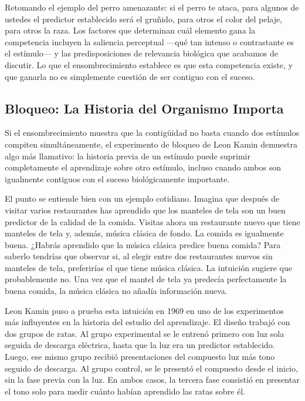 \documentclass[
  letterpaper,
  DIV=11,
  numbers=noendperiod]{scrreprt}
\begin{document}
\begin{tcolorbox}[enhanced jigsaw, toprule=.15mm, arc=.35mm, colback=white, opacityback=0, colframe=quarto-callout-note-color-frame, breakable, rightrule=.15mm, left=2mm, leftrule=.75mm, bottomrule=.15mm]
Retomando el ejemplo del perro amenazante: si el perro te ataca, para
algunos de ustedes el predictor establecido será el gruñido, para otros
el color del pelaje, para otros la raza. Los factores que determinan
cuál elemento gana la competencia incluyen la saliencia perceptual
---qué tan intenso o contrastante es el estímulo--- y las
predisposiciones de relevancia biológica que acabamos de discutir. Lo
que el ensombrecimiento establece es que esta competencia existe, y que
ganarla no es simplemente cuestión de ser contiguo con el suceso.

\subsection{Bloqueo: La Historia del Organismo
Importa}\label{bloqueo-la-historia-del-organismo-importa}

Si el ensombrecimiento muestra que la contigüidad no basta cuando dos
estímulos compiten simultáneamente, el experimento de bloqueo de Leon
Kamin demuestra algo más llamativo: la historia previa de un estímulo
puede suprimir completamente el aprendizaje sobre otro estímulo, incluso
cuando ambos son igualmente contiguos con el suceso biológicamente
importante.

El punto se entiende bien con un ejemplo cotidiano. Imagina que después
de visitar varios restaurantes has aprendido que los manteles de tela
son un buen predictor de la calidad de la comida. Visitas ahora un
restaurante nuevo que tiene manteles de tela y, además, música clásica
de fondo. La comida es igualmente buena. ¿Habrás aprendido que la música
clásica predice buena comida? Para saberlo tendrías que observar si, al
elegir entre dos restaurantes nuevos sin manteles de tela, preferirías
el que tiene música clásica. La intuición sugiere que probablemente no.
Una vez que el mantel de tela ya predecía perfectamente la buena comida,
la música clásica no añadía información nueva.

Leon Kamin puso a prueba esta intuición en 1969 en uno de los
experimentos más influyentes en la historia del estudio del aprendizaje.
El diseño trabajó con dos grupos de ratas. Al grupo experimental se le
entrenó primero con luz sola seguida de descarga eléctrica, hasta que la
luz era un predictor establecido. Luego, ese mismo grupo recibió
presentaciones del compuesto luz más tono seguido de descarga. Al grupo
control, se le presentó el compuesto desde el inicio, sin la fase previa
con la luz. En ambos casos, la tercera fase consistió en presentar el
tono solo para medir cuánto habían aprendido las ratas sobre él.


\end{tcolorbox}
\end{document}
